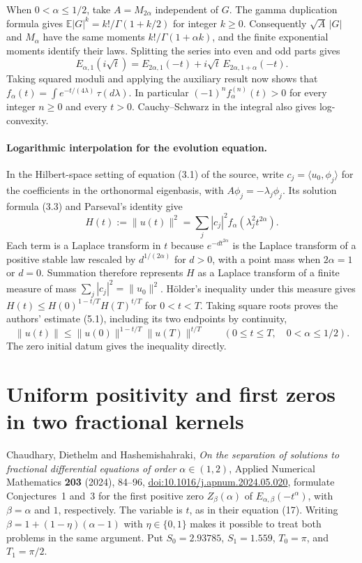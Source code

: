 \documentclass[11pt,a4paper]{article}
\numberwithin{equation}{section}
\begin{document}
When $0<\alpha\le1/2$, take $A=M_{2\alpha}$ independent of $G$. The gamma duplication formula gives $\mathbb E|G|^k=k!/\Gamma(1+k/2)$ for integer $k\ge0$. Consequently $\sqrt A\,|G|$ and $M_\alpha$ have the same moments $k!/\Gamma(1+\alpha k)$, and the finite exponential moments identify their laws. Splitting the series into even and odd parts gives
\[
 E_{\alpha,1}(i\sqrt t)=E_{2\alpha,1}(-t)
     +i\sqrt t\,E_{2\alpha,1+\alpha}(-t).
\]
Taking squared moduli and applying the auxiliary result now shows that $f_\alpha(t)=\int e^{-t/(4\lambda)}\,\tau(d\lambda)$. In particular $(-1)^n f_\alpha^{(n)}(t)>0$ for every integer $n\ge0$ and every $t>0$. Cauchy--Schwarz in the integral also gives log-convexity.

\paragraph{Logarithmic interpolation for the evolution equation.}
In the Hilbert-space setting of equation (3.1) of the source, write $c_j=\langle u_0,\phi_j\rangle$ for the coefficients in the orthonormal eigenbasis, with $A\phi_j=-\lambda_j\phi_j$. Its solution formula (3.3) and Parseval's identity give
\[
 H(t):=\|u(t)\|^2=\sum_j |c_j|^2 f_\alpha(\lambda_j^2 t^{2\alpha}).
\]
Each term is a Laplace transform in $t$ because $e^{-d t^{2\alpha}}$ is the Laplace transform of a positive stable law rescaled by $d^{1/(2\alpha)}$ for $d>0$, with a point mass when $2\alpha=1$ or $d=0$. Summation therefore represents $H$ as a Laplace transform of a finite measure of mass $\sum_j |c_j|^2=\|u_0\|^2$. Hölder's inequality under this measure gives $H(t)\le H(0)^{1-t/T}H(T)^{t/T}$ for $0<t<T$. Taking square roots proves the authors' estimate (5.1), including its two endpoints by continuity,
\[
 \|u(t)\|\le\|u(0)\|^{1-t/T}\|u(T)\|^{t/T}
 \qquad(0\le t\le T,\quad 0<\alpha\le 1/2).
\]
The zero initial datum gives the inequality directly.


\section{Uniform positivity and first zeros in two fractional kernels}
\label{sec:cdh13}

Chaudhary, Diethelm and Hashemishahraki, \emph{On the separation of
solutions to fractional differential equations of order $\alpha\in(1,2)$},
Applied Numerical Mathematics \textbf{203} (2024), 84--96,
\href{https://doi.org/10.1016/j.apnum.2024.05.020}{doi:10.1016/j.apnum.2024.05.020},
formulate Conjectures~1 and~3 for the first positive zero $Z_\beta(\alpha)$
of $E_{\alpha,\beta}(-t^\alpha)$, with $\beta=\alpha$ and $1$,
respectively. The variable is $t$, as in their equation (17).
Writing $\beta=1+(1-\eta)(\alpha-1)$ with $\eta\in\{0,1\}$ makes
it possible to treat both problems in the same argument. Put
$S_0=2.93785$, $S_1=1.559$, $T_0=\pi$, and $T_1=\pi/2$.
\end{document}
